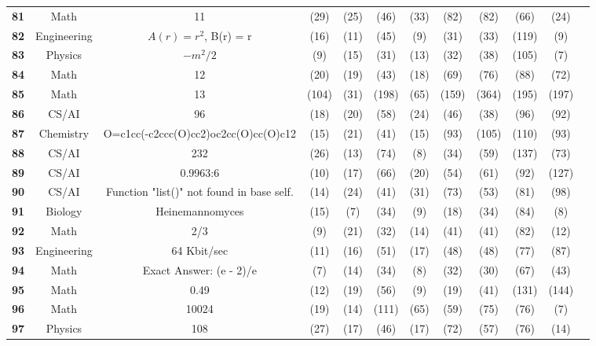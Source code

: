 \begin{table*}[htb]
\begin{center}
\begin{tiny}
\begin{tabular}{l|c|c|ccccccccc}
\textbf{81} & Math & 11  & \X (29) & \C (25) & \X (46) & \X (33) & \X (82) & \C (82) & \X (66) & \X (24)\\
\textbf{82} & Engineering & $A(r) = r^2$, \quad B(r) = r  & \X (16) & \X (11) & \X (45) & \X (9) & \X (31) & \X (33) & \X (119) & \X (9)\\
\textbf{83} & Physics & $-m^2/2$  & \X (9) & \X (15) & \X (31) & \X (13) & \X (32) & \X (38) & \X (105) & \X (7)\\
\textbf{84} & Math & 12  & \X (20) & \X (19) & \X (43) & \X (18) & \X (69) & \X (76) & \X (88) & \X (72)\\
\textbf{85} & Math & 13  & \X (104) & \X (31) & \X (198) & \X (65) & \X (159) & \X (364) & \X (195) & \X (197)\\
\textbf{86} & CS/AI & 96  & \X (18) & \X (20) & \X (58) & \X (24) & \X (46) & \X (38) & \X (96) & \X (92)\\
\textbf{87} & Chemistry & O=c1cc(-c2ccc(O)cc2)oc2cc(O)cc(O)c12  & \X (15) & \X (21) & \X (41) & \X (15) & \X (93) & \X (105) & \X (110) & \X (93)\\
\textbf{88} & CS/AI & 232  & \X (26) & \X (13) & \X (74) & \X (8) & \X (34) & \X (59) & \X (137) & \X (73)\\
\textbf{89} & CS/AI & 0.9963:6  & \X (10) & \X (17) & \X (66) & \C (20) & \C (54) & \C (61) & \X (92) & \X (127)\\
\textbf{90} & CS/AI & Function "list()" not found in base self.  & \X (14) & \X (24) & \X (41) & \X (31) & \X (73) & \X (53) & \X (81) & \X (98)\\
\textbf{91} & Biology & Heinemannomyces  & \X (15) & \X (7) & \X (34) & \X (9) & \X (18) & \X (34) & \X (84) & \X (8)\\
\textbf{92} & Math & 2/3  & \C (9) & \X (21) & \X (32) & \C (14) & \X (41) & \X (41) & \X (82) & \X (12)\\
\textbf{93} & Engineering & 64 Kbit/sec  & \X (11) & \X (16) & \X (51) & \X (17) & \X (48) & \X (48) & \X (77) & \X (87)\\
\textbf{94} & Math & Exact Answer: (e - 2)/e  & \X (7) & \X (14) & \X (34) & \X (8) & \X (32) & \X (30) & \X (67) & \X (43)\\
\textbf{95} & Math & 0.49  & \X (12) & \X (19) & \X (56) & \X (9) & \X (19) & \X (41) & \X (131) & \X (144)\\
\textbf{96} & Math & 10024  & \X (19) & \C (14) & \X (111) & \C (65) & \C (59) & \X (75) & \X (76) & \X (7)\\
\textbf{97} & Physics & 108  & \C (27) & \X (17) & \X (46) & \C (17) & \X (72) & \X (57) & \X (76) & \X (14)\\

\end{tabular}
\end{tiny}
\end{center}
\end{table*}
